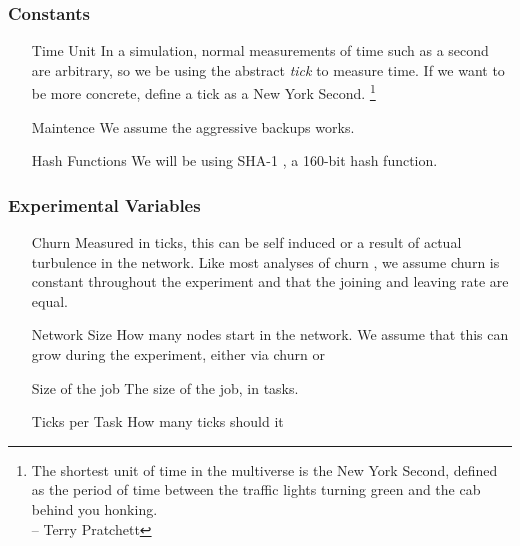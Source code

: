 \subsubsection{Constants}

\begin{enumerate}
	\item[Time Unit] In a simulation, normal measurements of time such as a second are arbitrary, so we be using the abstract \textit{tick} to measure time.  
	If we want to be more concrete, define a tick as a New York Second. \footnote{The shortest unit of time in the multiverse is the New York Second, defined as the period of time between the traffic lights turning green and the cab behind you honking.\\-- Terry Pratchett}
	\item[Maintence] We assume the aggressive backups works.
	\item[Hash Functions] We will be using SHA-1 \cite{sha1}, a 160-bit hash function.
\end{enumerate}

\subsubsection{Experimental Variables}
\begin{enumerate}
	\item[Churn] Measured in ticks, this can be self induced or a result of actual turbulence in the network.
	Like most analyses of churn \cite{marozzo2012p2p}, we assume churn is constant throughout the experiment and that the joining and leaving rate are equal.
	\item[Network Size]  How many nodes start in the network.  We assume that this can grow during the experiment, either via churn or 
	\item[Size of the job] The size of the job, in tasks.
	\item[Ticks per Task] How many ticks should it
\end{enumerate}